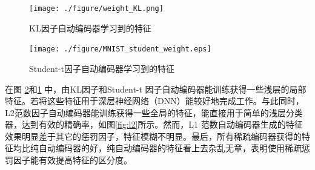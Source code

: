 \documentclass[oneside]{ZJUthesis}
\begin{document}
\begin{figure}[h] 
\centering
\texttt{[image: ./figure/weight\_KL.png]}
\caption{KL因子自动编码器学习到的特征\label{fig:kl}}
\end{figure}

\begin{figure}[h] 
\centering
\texttt{[image: ./figure/MNIST\_student\_weight.eps]}
\caption{Student-t因子自动编码器学习到的特征\label{fig:st}}
\end{figure}

在图 \ref{fig:st}和\ref{fig:kl} 中，由KL因子和Student-t 因子自动编码器能训练获得一些浅层的局部特征。若将这些特征用于深层神经网络（DNN）能较好地完成工作。与此同时，L2范数因子自动编码器能训练获得一些全局的特征，能直接用于简单的浅层分类器，达到有效的精确率，如图\ref{fig:l2}所示。然而，L1 范数自动编码器生成的特征效果明显差于其它的惩罚因子，特征模糊不明显。最后，所有稀疏编码器获得的特征均比纯自动编码器的好，纯自动编码器的特征看上去杂乱无章，表明使用稀疏惩罚因子能有效提高特征的区分度。
\end{document}
